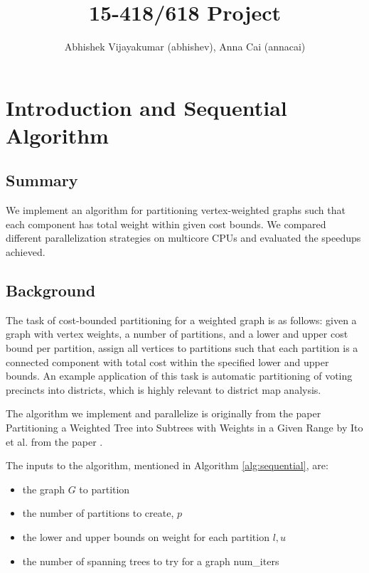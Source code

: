 \documentclass[11pt]{article}
\begin{document}
\title{15-418/618 Project}

\author{Abhishek Vijayakumar (abhishev), Anna Cai (annacai)}
\date{}

\maketitle

\section{Introduction and Sequential Algorithm}

\subsection{Summary}

We implement an algorithm for partitioning vertex-weighted graphs such that each component has total weight within given cost bounds.
We compared different parallelization strategies on multicore CPUs and evaluated the speedups achieved.

\subsection{Background}

The task of cost-bounded partitioning for a weighted graph is as follows: given a graph with vertex weights, a number of partitions, and a lower and upper cost bound per partition, assign all vertices to partitions such that each partition is a connected component with total cost within the specified lower and upper bounds.
An example application of this task is automatic partitioning of voting precincts into districts, which is highly relevant to district map analysis.

The algorithm we implement and parallelize is originally from the paper Partitioning a Weighted Tree into Subtrees with Weights in a Given Range
by Ito et al. from the paper \cite{Ito2010PartitioningAW}.

The inputs to the algorithm, mentioned in Algorithm \ref{alg:sequential}, are:
\begin{itemize}
    \item the graph $G$ to partition
    \item the number of partitions to create, $p$
    \item the lower and upper bounds on weight for each partition $l, u$
    \item the number of spanning trees to try for a graph num\_iters
\end{itemize}
\end{document}
